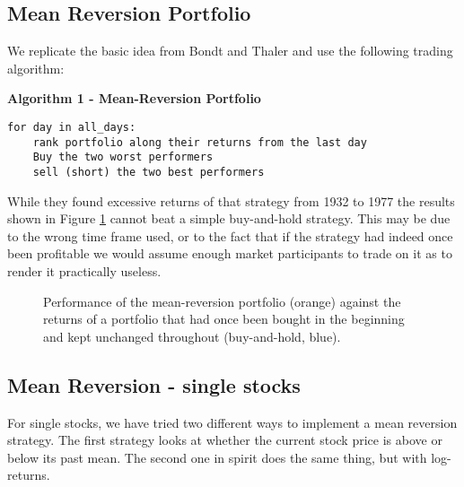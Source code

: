 \subsection{Mean Reversion Portfolio}
We replicate the basic idea from Bondt and Thaler \citet{bondt_does_1985} and use the following trading algorithm: 

\vspace{2ex}
\textbf{\small{Algorithm 1 - Mean-Reversion Portfolio}}
\vspace{-1ex}
\begin{verbatim}
for day in all_days: 
    rank portfolio along their returns from the last day
    Buy the two worst performers
    sell (short) the two best performers
\end{verbatim}

While they found excessive returns of that strategy from 1932 to 1977 the results shown in Figure \ref{fig:mean reversion} cannot beat a simple buy-and-hold strategy. This may be due to the wrong time frame used, or to the fact that if the strategy had indeed once been profitable we would assume enough market participants to trade on it as to render it practically useless. 


\begin{figure}[h!]
    \centering
    \begin{adjustbox}{width=.95\textwidth,center}
        
    \end{adjustbox}  
    \caption{Performance of the mean-reversion portfolio (orange) against the returns of a portfolio that had once been bought in the beginning and kept unchanged throughout (buy-and-hold, blue).}
    \label{fig:mean reversion}
\end{figure}{}

\subsection{Mean Reversion - single stocks}
For single stocks, we have tried two different ways to implement a mean reversion strategy. The first strategy looks at whether the current stock price is above or below its past mean. The second one in spirit does the same thing, but with log-returns. 

